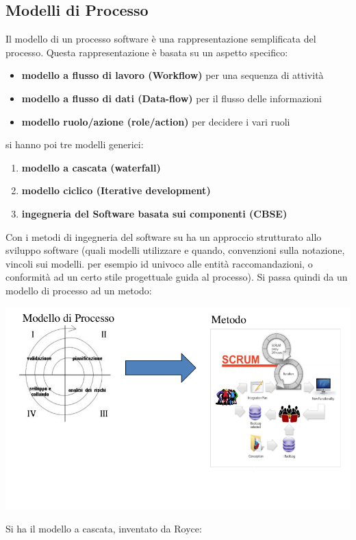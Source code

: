 \documentclass[a4paper,12pt, oneside]{book}
\begin{document}
\subsection{Modelli di Processo}
Il modello di un processo software è una rappresentazione
semplificata del processo. Questa rappresentazione è basata su un aspetto specifico:
\begin{itemize}
\item \textbf{modello a flusso di lavoro (Workflow)} per una sequenza di attività
\item \textbf{modello a flusso di dati (Data-flow)} per il flusso delle informazioni
\item \textbf{modello ruolo/azione (role/action)} per decidere i vari ruoli
\end{itemize}
si hanno poi tre modelli generici:
\begin{enumerate}
\item \textbf{modello a cascata (waterfall)}
\item \textbf{modello ciclico (Iterative development)}
\item \textbf{ingegneria del Software basata sui componenti (CBSE)}
\end{enumerate}
Con i metodi di ingegneria del software su ha un approccio strutturato allo sviluppo software (quali modelli utilizzare e quando, convenzioni sulla notazione, vincoli sui
modelli. per esempio  id univoco alle entità raccomandazioni, o conformità ad un certo stile progettuale guida al processo). Si passa quindi da un modello di processo ad un metodo:
\begin{center}
\includegraphics[scale=2.0]{img/ing.png}
\end{center}
Si ha il modello a cascata, inventato da Royce:
\end{document}
